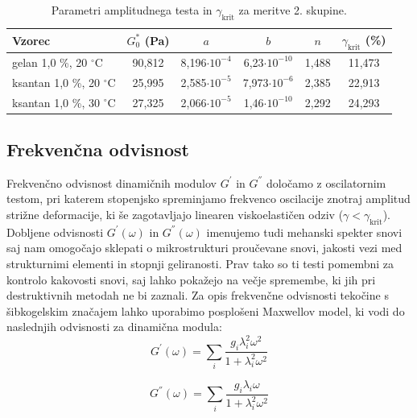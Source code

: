 \documentclass{article}
\begin{document}
\renewcommand{\arraystretch}{1.5}
\begin{table} 
\centering
\caption{Parametri amplitudnega testa in $\gamma_\mathrm{krit}$ za meritve 2. skupine.}
\label{tab:ampl2}
\begin{tabular}{ l  c  c  c  c  c }
   \toprule
   Vzorec & $G^*_0$ (Pa) & $a$ & $b$ & $n$ & $\gamma_\mathrm{krit}$ (\%) \\ 
   \midrule
   gelan 1,0 \%, 20 $^\circ$C   & 90,812 & 8,196$\cdot10^{-4}$ & 6,23$\cdot10^{-10} $& 1,488 & 11,473 \\
   ksantan 1,0 \%, 20 $^\circ$C & 25,995 & 2,585$\cdot10^{-5}$ & 7,973$\cdot10^{-6} $& 2,385 & 22,913 \\
   ksantan 1,0 \%, 30 $^\circ$C & 27,325 & 2,066$\cdot10^{-5}$ & 1,46$\cdot10^{-10} $& 2,292 & 24,293 \\
   \bottomrule
\end{tabular}

\end{table}


\subsection{Frekvenčna odvisnost}

Frekvenčno odvisnost dinamičnih modulov $G^{'}$ in $G^{''}$ določamo z oscilatornim testom, pri katerem stopenjsko spreminjamo frekvenco oscilacije znotraj amplitud strižne deformacije, ki še zagotavljajo linearen viskoelastičen odziv ($\gamma < \gamma_\mathrm{krit}$). Dobljene odvisnosti $G^{'}(\omega)$ in $G^{''}(\omega)$ imenujemo tudi mehanski spekter snovi saj nam omogočajo sklepati o mikrostrukturi proučevane snovi, jakosti vezi med strukturnimi elementi in stopnji geliranosti. Prav tako so ti testi pomembni za kontrolo kakovosti snovi, saj lahko pokažejo na večje spremembe, ki jih pri destruktivnih metodah ne bi zaznali.
Za opis frekvenčne odvisnosti tekočine s šibkogelskim značajem lahko uporabimo posplošeni Maxwellov model, ki vodi do naslednjih odvisnosti za dinamična modula:
\begin{equation} \label{eq:G1}
G^{'}(\omega) = \sum\limits_{i} \frac{g_i \lambda_i^2 \omega^2}{1 + \lambda_i^2 \omega^2}
\end{equation}

\begin{equation} \label{eq:G2}
G^{''}(\omega) = \sum\limits_{i} \frac{g_i \lambda_i \omega}{1 + \lambda_i^2 \omega^2}
\end{equation}
\end{document}

